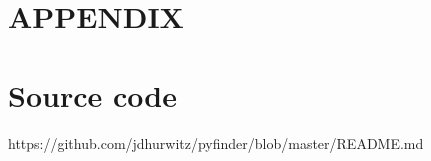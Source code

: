 \documentclass[sigconf]{acmart}
\begin{document}


\maketitle







\appendix
\section*{APPENDIX}
  \section{Source code}
    https://github.com/jdhurwitz/pyfinder/blob/master/README.md
    
\end{document}
